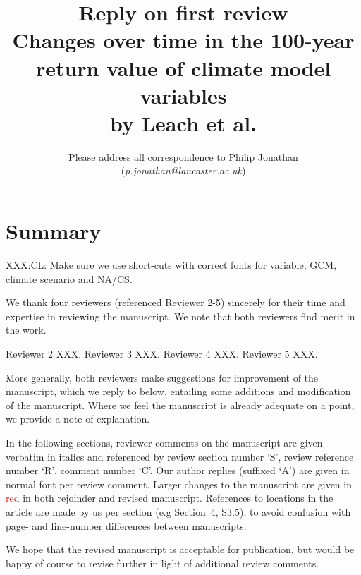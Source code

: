 \documentclass[a4paper,10pt]{article}
\providecommand{\np}{\vspace{10pt}}
\newcommand{\ed}[1]{\textcolor{red}{#1}}
\providecommand{\np}{\vspace{10pt}}
\begin{document}
	
	\title{\textbf{Reply on first review} \np \\ Changes over time in the 100-year return value of climate model variables \np \\ by Leach et al.}
	\np
	\author{Please address all correspondence to Philip Jonathan (\emph{p.jonathan@lancaster.ac.uk})}
	\date{}
	\maketitle
	
	\section*{Summary}
	
	XXX:CL: Make sure we use short-cuts with correct fonts for variable, GCM, climate scenario and NA/CS.
	
	We thank four reviewers (referenced Reviewer 2-5) sincerely for their time and expertise in reviewing the manuscript. We note that both reviewers find merit in the work. 
	
	Reviewer 2 XXX. Reviewer 3 XXX. Reviewer 4 XXX. Reviewer 5 XXX.
	
	More generally, both reviewers make suggestions for improvement of the manuscript, which we reply to below, entailing some additions and modification of the manuscript. Where we feel the manuscript is already adequate on a point, we provide a note of explanation. 
	
	In the following sections, reviewer comments on the manuscript are given verbatim in italics and referenced by review section number `S', review reference number `R', comment number `C'. Our author replies (suffixed `A') are given in normal font per review comment. Larger changes to the manuscript are given in \ed{red} in both rejoinder and revised manuscript. References to locations in the article are made by us per section (e.g Section~4, S3.5), to avoid confusion with page- and line-number differences between manuscripts. 
	
	We hope that the revised manuscript is acceptable for publication, but would be happy of course to revise further in light of additional review comments.
	
\end{document}
